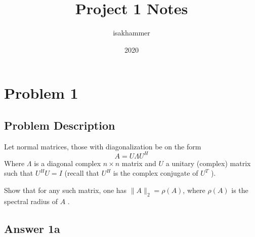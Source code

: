 \documentclass{article}
\title{Project 1 Notes}
\author{isakhammer }
\date{2020}
\theoremstyle{remark}
\newcommand{\newpara}
  {
  \vskip 0.4cm
  }
\begin{document}
\maketitle
\tableofcontents
\newpage

\newpage
\section{Problem 1}%
\label{sec:problem_1}
\subsection{Problem Description}%
\label{sub:problem_describtion}

Let normal matrices, those with diagonalization be on the form \[
A = U \Lambda U^{H} 
\] 
Where $\Lambda $ is a diagonal complex $n\times n $ matrix and $U$ a unitary (complex) matrix such that $U ^{H} U = I$ (recall that $U^{H}$ is the complex conjugate of $U^{T}$ ).
\newpara
Show that for any such matrix, one has $\|A\|_{2} = \rho \left( A \right)$, where $\rho \left( A \right) $ is the spectral radius of $A$ .

\subsection{Answer 1a}%
\label{sub:proof}
\end{document}
